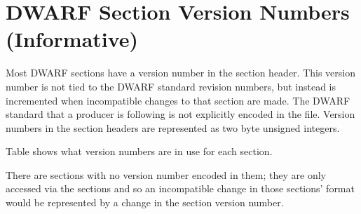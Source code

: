 
\chapter[Section Version Numbers (Informative)]{DWARF Section Version Numbers (Informative)}
\label{app:dwarfsectionversionnumbersinformative}


Most DWARF sections have a version number in the section
header. This version number is not tied to the DWARF standard
revision numbers, but instead is incremented when incompatible
changes to that section are made. The DWARF standard that
a producer is following is not explicitly encoded in the
file. Version numbers in the section headers are represented
as two byte unsigned integers. 

Table 
shows what version
numbers are in use for each section.

There are sections with no version number encoded in them;
they are only accessed via the 
\dotdebuginfo{} 
sections and so an incompatible change in those sections'
format would be represented by a change in the 
\dotdebuginfo{} section version number.

